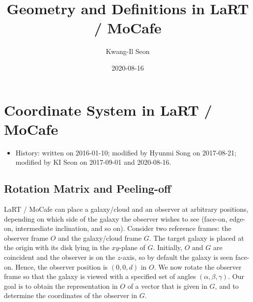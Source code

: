 \documentclass[english,a4paper]{my_memo}
\begin{document}
\title{Geometry and Definitions in LaRT / MoCafe}
\author{Kwang-Il Seon}
\date{2020-08-16}
\maketitle

\tableofcontents
\bigskip

\section{Coordinate System in LaRT / MoCafe}
\begin{itemize}
\item History: written on 2016-01-10; modified by Hyunmi Song on 2017-08-21;
  modified by KI Seon on 2017-09-01 and 2020-08-16.
\end{itemize}

\subsection{Rotation Matrix and Peeling-off}

LaRT / MoCafe can place a galaxy/cloud and an observer at arbitrary
positions, depending on which side of the galaxy the observer wishes
to see (face-on, edge-on, intermediate inclination, and so on).
Consider two reference frames: the observer frame $O$ and the
galaxy/cloud frame $G$. The target galaxy is placed at the origin
with its disk lying in the $xy$-plane of $G$. Initially, $O$ and $G$
are coincident and the observer is on the $z$-axis, so by default
the galaxy is seen face-on. Hence, the observer position is
$(0,0,d)$ in $O$. We now rotate the observer frame so that the
galaxy is viewed with a specified set of angles
$(\alpha, \beta, \gamma)$. Our goal is to obtain the representation
in $O$ of a vector that is given in $G$, and to determine the
coordinates of the observer in $G$.
\end{document}
